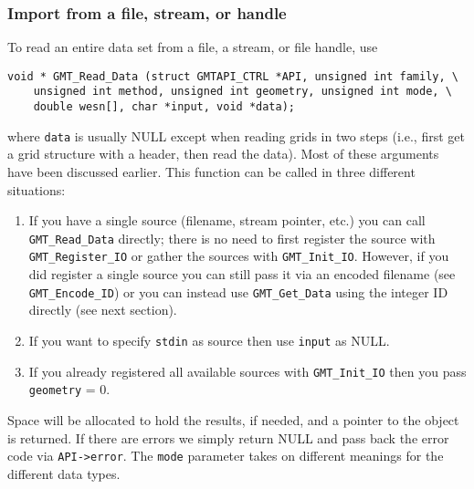 \documentclass[11pt]{report}
\begin{document}
\subsubsection{Import from a file, stream, or handle}
To read an entire data set from a file, a stream, or file handle, use
\begin{verbatim}
void * GMT_Read_Data (struct GMTAPI_CTRL *API, unsigned int family, \
    unsigned int method, unsigned int geometry, unsigned int mode, \
    double wesn[], char *input, void *data);
\end{verbatim}
where \texttt{data} is usually NULL except when reading grids in two steps
(i.e., first get a grid structure with a header, then read the data).
Most of these arguments have been discussed earlier.  This function can
be called in three different situations:
\begin{enumerate}
\item If you have a single source (filename, stream pointer, etc.) you can call
\texttt{GMT\_Read\_Data} directly; there is no need to first register the source
with \texttt{GMT\_Register\_IO} or gather the sources with \texttt{GMT\_Init\_IO}.
However, if you did register a single source you can still pass it via an encoded
filename (see \texttt{GMT\_Encode\_ID}) or you can instead use \texttt{GMT\_Get\_Data}
using the integer ID directly (see next section).
\item If you want to specify \texttt{stdin} as source then use \texttt{input} as NULL.
\item If you already registered all available sources with \texttt{GMT\_Init\_IO} then
you pass \texttt{geometry} = 0.
\end{enumerate}
Space will be allocated to hold the results, if needed, and a pointer to the object is returned.
If there are errors we simply return NULL and pass back the error code via \texttt{API->error}.
The \texttt{mode} parameter takes on different meanings for the different data types.
\end{document}
